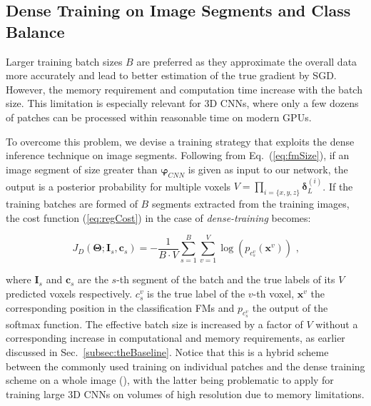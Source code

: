\documentclass[preprint,authoryear,12pt]{elsarticle}
\newcommand{\eqcm}{\textrm{ ,}}
\begin{document}
\subsection{Dense Training on Image Segments and Class Balance}
\label{subsec:denseTraining}

Larger training batch sizes $B$ are preferred as they approximate the overall data more accurately and lead to better estimation of the true gradient by SGD. However, the memory requirement and computation time increase with the batch size. This limitation is especially relevant for 3D CNNs, where only a few dozens of patches can be processed within reasonable time on modern GPUs.

To overcome this problem, we devise a training strategy that exploits the dense inference technique on image segments. Following from Eq.~(\ref{eq:fmSize}), if an image segment of size greater than $\boldsymbol{\varphi}_{CNN}$ is given as input to our network, the output is a posterior probability for multiple voxels $V=\prod_{i=\{x,y,z\}}{\boldsymbol{\delta}_L^{(i)}}$. If the training batches are formed of $B$ segments extracted from the training images, the cost function (\ref{eq:regCost}) in the case of \textit{dense-training} becomes:

\begin{equation} \label{eq:costDense}
J_D(\mathbf{\Theta}; \mathbf{I}_s, \mathbf{c}_s) = - \frac{1}{B \cdot V} \sum_{s=1}^{B} \sum_{v=1}^{V} \log( p_{c_s^v}(\mathbf{x}^v)) \eqcm
\end{equation}

where $\mathbf{I}_s$ and $\mathbf{c}_s$ are the $s$-th segment of the batch and the true labels of its $V$ predicted voxels respectively. $c_s^v$ is the true label of the $v$-th voxel, $\mathbf{x}^v$ the corresponding position in the classification FMs and $p_{c_s^v}$ the output of the softmax function. The effective batch size is increased by a factor of $V$ without a corresponding increase in computational and memory requirements, as earlier discussed in Sec.~\ref{subsec:theBaseline}. Notice that this is a hybrid scheme between the commonly used training on individual patches and the dense training scheme on a whole image (\cite{Long2014}), with the latter being problematic to apply for training large 3D CNNs on volumes of high resolution due to memory limitations.
\end{document}
